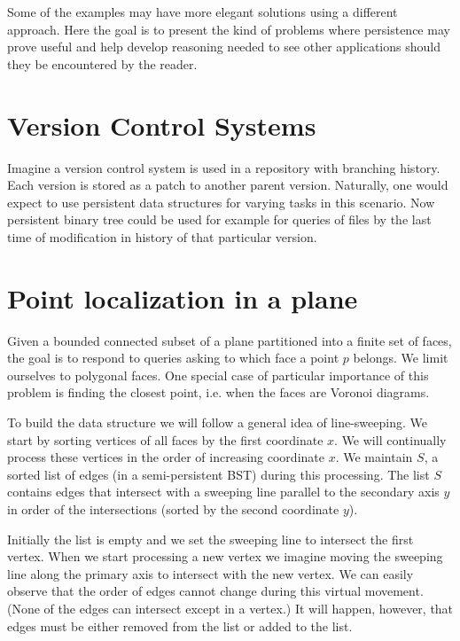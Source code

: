 Some of the examples may have more elegant solutions using a different approach. Here the goal is to present the kind of problems where persistence may prove useful and help develop reasoning needed to see other applications should they be encountered by the reader.

\section{Version Control Systems}

Imagine a version control system is used in a repository with branching history. Each version is stored as a patch to another parent version. Naturally, one would expect to use persistent data structures for varying tasks in this scenario. Now persistent binary tree could be used for example for queries of files by the last time of modification in history of that particular version.

\section{Point localization in a plane}

Given a bounded connected subset of a plane partitioned into a finite set of faces, the goal is to respond to queries asking to which face a point $p$ belongs. We limit ourselves to polygonal faces.
One special case of particular importance of this problem is finding the closest point, i.e. when the faces are Voronoi diagrams.

To build the data structure we will follow a general idea of line-sweeping. We start by sorting vertices of all faces by the first coordinate $x$. We will continually process these vertices in the order of increasing coordinate $x$. We maintain $S$, a sorted list of edges (in a semi-persistent BST) during this processing. The list $S$ contains edges that intersect with a sweeping line parallel to the secondary axis $y$ in order of the intersections (sorted by the second coordinate $y$).

Initially the list is empty and we set the sweeping line to intersect the first vertex.
When we start processing a new vertex we imagine moving the sweeping line along the primary axis to intersect with the new vertex. We can easily observe that the order of edges cannot change during this virtual movement. (None of the edges can intersect except in a vertex.) It will happen, however, that edges must be either removed from the list or added to the list.

